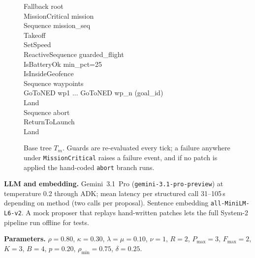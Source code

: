 \documentclass[conference]{IEEEtran}
\begin{document}
\begin{figure}[t]
\centering
\begin{minipage}{0.92\columnwidth}
\scriptsize\ttfamily
Fallback root\\
\hspace*{1em}MissionCritical mission\\
\hspace*{2em}Sequence mission\_seq\\
\hspace*{3em}Takeoff\\
\hspace*{3em}SetSpeed\\
\hspace*{3em}ReactiveSequence guarded\_flight\\
\hspace*{4em}IsBatteryOk min\_pct=25\\
\hspace*{4em}IsInsideGeofence\\
\hspace*{4em}Sequence waypoints\\
\hspace*{5em}GoToNED wp1 ... GoToNED wp\_n (goal\_id)\\
\hspace*{3em}Land\\
\hspace*{1em}Sequence abort\\
\hspace*{2em}ReturnToLaunch\\
\hspace*{2em}Land
\end{minipage}
\caption{Base tree $T_m$. Guards are re-evaluated every tick; a failure anywhere under \texttt{MissionCritical} raises a failure event, and if no patch is applied the hand-coded \texttt{abort} branch runs.}
\label{fig:basetree}
\end{figure}

\textbf{LLM and embedding.} Gemini~3.1~Pro (\texttt{gemini-3.1-pro-preview}) at temperature 0.2 through ADK; mean latency per structured call 31--105\,s depending on method (two calls per proposal). Sentence embedding \texttt{all-MiniLM-L6-v2}. A mock proposer that replays hand-written patches lets the full System-2 pipeline run offline for tests.

\textbf{Parameters.} $\rho=0.80$, $\kappa=0.30$, $\lambda=\mu=0.10$, $\nu=1$, $R=2$, $P_{\max}=3$, $F_{\max}=2$, $K=3$, $B=4$, $p=0.20$, $\rho_{\min}=0.75$, $\delta=0.25$.
\end{document}
